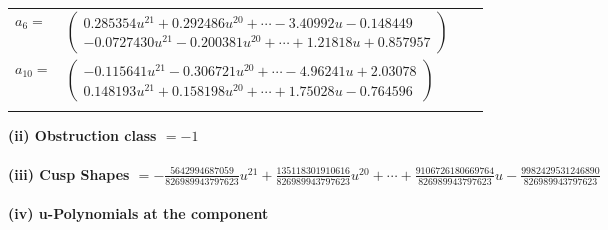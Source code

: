 \documentclass[1p]{elsarticle_modified}
\theoremstyle{definition}
\begin{document}
\begin{tabular}{m{7pt} m{180pt} m{7pt} m{180pt} }
\flushright $a_{6}=$&$\begin{pmatrix}0.285354 u^{21}+0.292486 u^{20}+\cdots-3.40992 u-0.148449\\-0.0727430 u^{21}-0.200381 u^{20}+\cdots+1.21818 u+0.857957\end{pmatrix}$ \\
\flushright $a_{10}=$&$\begin{pmatrix}-0.115641 u^{21}-0.306721 u^{20}+\cdots-4.96241 u+2.03078\\0.148193 u^{21}+0.158198 u^{20}+\cdots+1.75028 u-0.764596\end{pmatrix}$\\&\end{tabular}
\flushleft \textbf{(ii) Obstruction class $= -1$}\\~\\
\flushleft \textbf{(iii) Cusp Shapes $= -\frac{5642994687059}{826989943797623} u^{21}+\frac{135118301910616}{826989943797623} u^{20}+\cdots+\frac{9106726180669764}{826989943797623} u-\frac{9982429531246890}{826989943797623}$}\\~\\
\newpage\renewcommand{\arraystretch}{1}
\flushleft \textbf{(iv) u-Polynomials at the component}\newline \\
\end{document}
